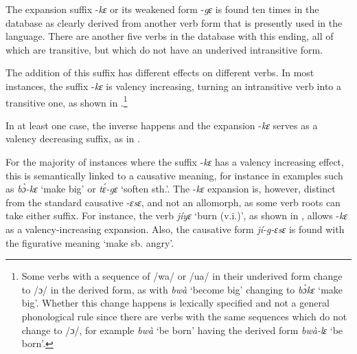 The expansion suffix -{\itshape kɛ} or its weakened form -{\itshape gɛ} is found ten times in the database as clearly derived from another verb form that is presently used in the language. There are another five verbs in the database with this ending, all of which are transitive, but which do not have an underived intransitive form.

The addition of this suffix has different effects on different verbs. In most instances, the suffix -{\itshape kɛ} is valency increasing, turning an intransitive verb into a transitive one, as shown in .\footnote{Some verbs with a sequence of /wa/ or /ua/ in their underived form change to /ɔ/ in the derived form, as with {\itshape bwà} `become big' changing to {\itshape bɔ̀kɛ} `make big'. Whether this change happens is lexically specified and not a general phonological rule since there are verbs with the same sequences which do not change to /ɔ/, for example {\itshape bwà} `be born' having the derived form {\itshape bwà-lɛ} `be born'.} %




In at least one case, the inverse happens and the expansion -{\itshape kɛ} serves as a valency decreasing suffix, as in .



For the majority of instances where the suffix -{\itshape kɛ} has a valency increasing effect, this is semantically linked to a causative meaning, for instance in examples such as {\itshape bɔ̀-kɛ} `make big' or {\itshape tɛ́-gɛ} `soften sth.'. The -{\itshape kɛ} expansion is, however, distinct from the standard causative -{\itshape ɛsɛ}, and not an allomorph, as some verb roots can take either suffix. 
For instance, the verb {\itshape jíyɛ} `burn (v.i.)', as shown in , allows -{\itshape kɛ} as a valency-increasing expansion. Also, the causative form {\itshape jí-g-ɛsɛ} is found with the figurative meaning `make sb. angry'.


